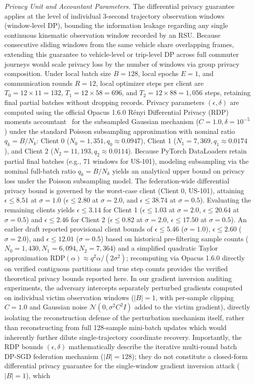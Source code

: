 \documentclass[journal]{IEEEtran}
\begin{document}
\textit{Privacy Unit and Accountant Parameters.} The differential privacy guarantee applies at the level of individual 3-second trajectory observation windows (window-level DP), bounding the information leakage regarding any single continuous kinematic observation window recorded by an RSU. Because consecutive sliding windows from the same vehicle share overlapping frames, extending this guarantee to vehicle-level or trip-level DP across full commuter journeys would scale privacy loss by the number of windows via group privacy composition. Under local batch size $B=128$, local epochs $E=1$, and communication rounds $R=12$, local optimizer steps per client are $T_0 = 12 \times 11 = 132$, $T_1 = 12 \times 58 = 696$, and $T_2 = 12 \times 88 = 1{,}056$ steps, retaining final partial batches without dropping records. Privacy parameters $(\epsilon, \delta)$ are computed using the official Opacus 1.6.0 R\'enyi Differential Privacy (RDP) moments accountant~\cite{abadi2016deep} for the subsampled Gaussian mechanism ($C=1.0, \delta=10^{-5}$) under the standard Poisson subsampling approximation with nominal ratio $q_k = B / N_k$: Client 0 ($N_0 = 1{,}351, q_0 \approx 0.0947$), Client 1 ($N_1 = 7{,}369, q_1 \approx 0.0174$), and Client 2 ($N_2 = 11{,}193, q_2 \approx 0.0114$). Because PyTorch DataLoaders retain partial final batches (e.g., 71 windows for US-101), modeling subsampling via the nominal full-batch ratio $q_k = B/N_k$ yields an analytical upper bound on privacy loss under the Poisson subsampling model. The federation-wide differential privacy bound is governed by the worst-case client (Client 0, US-101), attaining $\epsilon \le 8.51$ at $\sigma = 1.0$ ($\epsilon \le 2.80$ at $\sigma = 2.0$, and $\epsilon \le 38.74$ at $\sigma = 0.5$). Evaluating the remaining clients yields $\epsilon \le 3.14$ for Client 1 ($\epsilon \le 1.03$ at $\sigma=2.0$, $\epsilon \le 20.64$ at $\sigma=0.5$) and $\epsilon \le 2.46$ for Client 2 ($\epsilon \le 0.82$ at $\sigma=2.0$, $\epsilon \le 17.50$ at $\sigma=0.5$). An earlier draft reported provisional client bounds of $\epsilon \le 5.46$ ($\sigma=1.0$), $\epsilon \le 2.60$ ($\sigma=2.0$), and $\epsilon \le 12.01$ ($\sigma=0.5$) based on historical pre-filtering sample counts ($N_0=1{,}430, N_1=6{,}094, N_2=7{,}364$) and a simplified quadratic Taylor approximation $\mathrm{RDP}(\alpha) \approx q^2 \alpha / (2\sigma^2)$; recomputing via Opacus 1.6.0 directly on verified contiguous partitions and true step counts provides the verified theoretical privacy bounds reported here. In our gradient inversion auditing experiments, the adversary intercepts separately perturbed gradients computed on individual victim observation windows ($|B|=1$, with per-sample clipping $C=1.0$ and Gaussian noise $\mathcal{N}(0, \sigma^2 C^2 I)$ added to the victim gradient), directly isolating the reconstruction defense of the perturbation mechanism itself, rather than reconstructing from full 128-sample mini-batch updates which would inherently further dilute single-trajectory coordinate recovery. Importantly, the RDP bounds $(\epsilon, \delta)$ mathematically describe the iterative multi-round batch DP-SGD federation mechanism ($|B|=128$); they do not constitute a closed-form differential privacy guarantee for the single-window gradient inversion attack ($|B|=1$), which 
\end{document}
